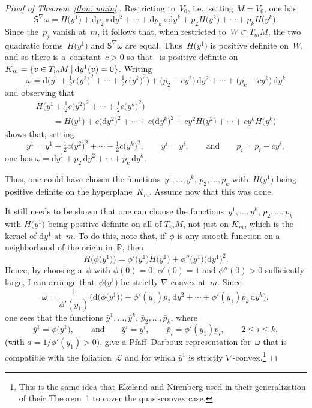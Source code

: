 \documentclass[10pt,a4paper]{amsart}
\renewcommand{\d}{\mathrm{d}}%
\newcommand{\cL}{{\mathcal L}}
\newcommand{\bbR}{{\mathbb R}}
\newcommand{\Ss}{\mathsf{S}}
\numberwithin{equation}{section}
\begin{document}
\begin{proof}[Proof of Theorem~\ref{thm: main}.]
Restricting to~$V_0$, i.e., setting $M=V_0$, one has
\[
\Ss^\nabla\omega = H\big(y^1\big) + \d p_2\circ \d y^2 + \cdots + \d p_k\circ \d y^k
 + p_2 H\big(y^2\big) + \cdots + p_k H\big(y^k\big).
\]
Since the~$p_j$ vanish at~$m$,
it follows that, when restricted to~$W\subset T_mM$,
the two quadratic forms~$H\big(y^1\big)$ and $\Ss^\nabla\omega$ are equal.
Thus~$H\big(y^1\big)$ is positive definite on~$W$,
and so there is a~constant~$c>0$
so that~\smash{$H\big(y^1\big) + c \big(\d y^2\big)^2 + \cdots + c \big(\d y^k\big)^2$}
is positive definite on~$K_m = \{v\in T_mM\ \vrule\ \d y^1(v) = 0\}$.
Writing
\[
\omega = \d\bigl(y^1 + \tfrac12c \big(y^2\big)^2 + \cdots + \tfrac12c \big(y^k\big)^2\bigr)
 + \big(p_2-c y^2\big)\,\d y^2 + \cdots + \big(p_k-c y^k\big)\,\d y^k
\]
and observing that
\begin{gather*}
H\big(y^1 + \tfrac12c \big(y^2\big)^2 + \cdots + \tfrac12c \big(y^k\big)^2\big)\\
\qquad = H\big(y^1\big) + c \big(\d y^2\big)^2 + \cdots + c \big(\d y^k\big)^2
 + c y^2 H\big(y^2\big) + \cdots + c y^k H\big(y^k\big)
\end{gather*}
shows that, setting
\[
\bar y^1 = y^1 + \tfrac12c \big(y^2\big)^2 + \cdots + \tfrac12c \big(y^k\big)^2,
\qquad
\bar y^i = y^i,
\qquad\text{and}\qquad
\bar p_i = p_i - c y^i,
\]
one has
$\omega = \d\bar y^1
 + \bar p_2\,\d \bar y^2 + \cdots + \bar p_k\,\d \bar y^k$.

Thus, one could have chosen the functions~$y^1,\ldots,y^k$, $p_2,\ldots,p_k$
with~$H\big(y^1\big)$ being positive definite on the hyperplane~$K_m$.
Assume now that this was done.

It still needs to be shown that one can choose
the functions~$y^1,\ldots,y^k$, $p_2,\ldots,p_k$
with $H\big(y^1\big)$ being positive definite on all of $T_mM$,
not just on $K_m$, which is the kernel of $\d y^1$ at~$m$.
To do this, note that, if~$\phi$ is any smooth function on a neighborhood
of the origin in~$\bbR$, then
\[
H\bigl(\phi\big(y^1\big)\bigr) = \phi'\big(y^1\big) H\big(y^1\big) + \phi''\big(y^1\big) \big(\d y^1\big)^2.
\]
Hence, by choosing a~$\phi$ with $\phi(0)=0$, $\phi'(0)=1$
and $\phi''(0)>0$ sufficiently large,
I can arrange that~$\phi\big(y^1\big)$ be strictly $\nabla$-convex at~$m$.
Since
\[
\omega = \frac{1}{\phi'(y_1)} \big(\d\bigl(\phi\big(y^1\big)\bigr)
    + \phi'(y_1)p_2\,\d y^2 +\cdots + \phi'(y_1)p_k\,\d y^k\big),
\]
one sees that the functions
$\bar y^1,\ldots,\bar y^k$, $\bar p_2,\ldots,\bar p_k$, where
\[
\bar y^1 = \phi\big(y^1\big),
\qquad\text{and}\qquad
\bar y^i = y^i,
\qquad
\bar p_i = \phi'(y_1)p_i,\qquad 2\le i\le k,
\]
(with $a = 1/\phi'(y_1) >0$), give a Pfaff--Darboux representation
for~$\omega$ that is compatible with the foliation~$\cL$ and
for which $\bar y^1$ is strictly $\nabla$-convex.\footnote{This is the same idea that Ekeland and Nirenberg \cite{MR2023129}
used in their generalization of their Theorem~1
to cover the quasi-convex case.}


\end{proof}
\end{document}
